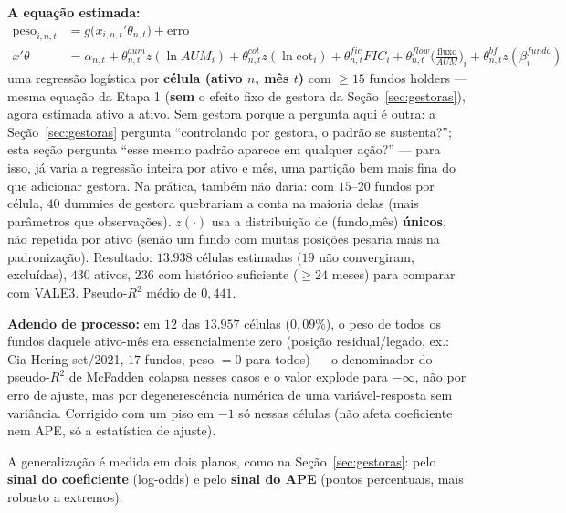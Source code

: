 \documentclass[11pt,a4paper]{article}
\newcommand{\equacao}[0]{\par\vspace{4pt}\noindent\textbf{\color{vermelho}A equação estimada:}\ }
\begin{document}
\equacao
\begin{align*}
\text{peso}_{i,n,t} &= g\big(x_{i,n,t}'\theta_{n,t}\big) + \text{erro} \\
x'\theta &= \alpha_{n,t} + \theta^{aum}_{n,t}z(\ln AUM_i) + \theta^{cot}_{n,t}z(\ln\text{cot}_i)
+ \theta^{fic}_{n,t}FIC_i + \theta^{flow}_{n,t}\Big(\tfrac{\text{fluxo}}{AUM}\Big)_i
+ \theta^{bf}_{n,t}z(\beta^{fundo}_i)
\end{align*}
uma regressão logística por \textbf{célula (ativo $n$, mês $t$)} com $\geq15$ fundos holders ---
mesma equação da Etapa 1 (\textbf{sem} o efeito fixo de gestora da Seção~\ref{sec:gestoras}), agora
estimada ativo a ativo. Sem gestora porque a pergunta aqui é outra: a Seção~\ref{sec:gestoras}
pergunta ``controlando por gestora, o padrão se sustenta?''; esta seção pergunta ``esse mesmo
padrão aparece em qualquer ação?'' --- para isso, já varia a regressão inteira por ativo e mês,
uma partição bem mais fina do que adicionar gestora. Na prática, também não daria: com
$15$--$20$ fundos por célula, $40$ dummies de gestora quebrariam a conta na maioria delas (mais
parâmetros que observações). $z(\cdot)$ usa a distribuição de (fundo,mês) \textbf{únicos}, não
repetida por ativo (senão um fundo com muitas posições pesaria mais na padronização). Resultado:
$13.938$ células estimadas ($19$ não convergiram, excluídas), $430$ ativos, $236$ com histórico
suficiente ($\geq24$ meses) para comparar com VALE3. Pseudo-$R^2$ médio de $0{,}441$.

\textbf{Adendo de processo:} em $12$ das $13.957$ células ($0{,}09\%$), o peso de todos os fundos
daquele ativo-mês era essencialmente zero (posição residual/legado, ex.: Cia Hering set/2021, $17$
fundos, peso $=0$ para todos) --- o denominador do pseudo-$R^2$ de McFadden colapsa nesses casos e
o valor explode para $-\infty$, não por erro de ajuste, mas por degenerescência numérica de uma
variável-resposta sem variância. Corrigido com um piso em $-1$ só nessas células (não afeta
coeficiente nem APE, só a estatística de ajuste).

A generalização é medida em dois planos, como na Seção~\ref{sec:gestoras}: pelo \textbf{sinal do
coeficiente} (log-odds) e pelo \textbf{sinal do APE} (pontos percentuais, mais robusto a
extremos).
\end{document}
